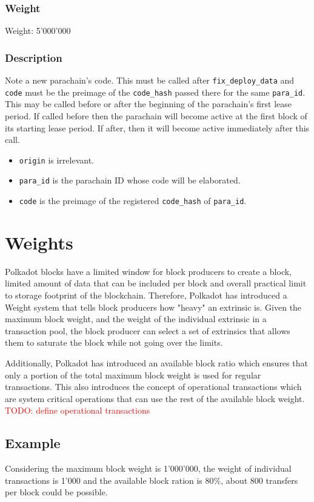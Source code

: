 \documentclass[11pt,a4paper]{article}
\newcommand{\todo}[1]{\textcolor{red}{TODO: #1}}
\begin{document}
\subsubsection*{Weight}
Weight: 5'000'000
\subsubsection*{Description}
Note a new parachain's code. This must be called after \verb|fix_deploy_data| and \verb|code| must be the preimage of the \verb|code_hash| passed there for the same \verb|para_id|. This may be called before or after the beginning of the parachain's first lease period. If called before then the parachain will become active at the first block of its starting lease period. If after, then it will become active immediately after this call.

\begin{itemize}
\item \verb|origin| is irrelevant.
\item \verb|para_id| is the parachain ID whose code will be elaborated.
\item \verb|code| is the preimage of the registered \verb|code_hash| of \verb|para_id|.
\end{itemize}

\section{Weights}
Polkadot blocks have a limited window for block producers to create a block,
limited amount of data that can be included per block and overall practical limit
to storage footprint of the blockchain. Therefore, Polkadot has introduced a Weight
system that tells block producers how "heavy" an extrinsic is. Given the maximum
block weight, and the weight of the individual extrinsic in a transaction pool,
the block producer can select a set of extrinsics that allows them to saturate the
block while not going over the limits.
\newline

Additionally, Polkadot has introduced an available block ratio which ensures that
only a portion of the total maximum block weight is used for regular transactions.
This also introduces the concept of operational transactions which are system
critical operations that can use the rest of the available block weight.
\todo{define operational transactions}
\newline

\subsection*{Example}
Considering the maximum block weight is 1'000'000, the weight of
individual transactions is 1'000 and the available block ration is 80\%,
about 800 transfers per block could be possible.
\end{document}
